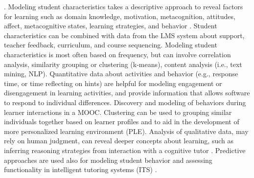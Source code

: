 \documentclass[sigconf]{acmart}
\begin{document}

.
Modeling student characteristics takes a descriptive approach to reveal factors 
for learning such as domain knowledge, 
motivation, metacognition, attitudes, affect, metacognitive states, learning 
strategies, and behavior \cite{Papamitsiou14}. Student characteristics can be 
combined with data from the LMS system about support, teacher feedback, 
curriculum, and course sequencing. Modeling student characteristics is most 
often based on frequency, but can involve correlation analysis, similarity 
grouping or clustering (k-means), content analysis (i.e., text mining, NLP). 
Quantitative data about activities and behavior (e.g., response time, or 
time reflecting on hints) are helpful for modeling engagement or disengagement 
in learning activities, and provide information that allows software to respond 
to individual differences. Discovery and modeling of behaviors during learner 
interactions in a MOOC.  Clustering can be used to grouping similar individuals 
together based on learner profiles and to aid in the development of more 
personalized learning environment (PLE)\cite{Vellido10}. Analysis of qualitative 
data, may rely on human judgment, can reveal deeper concepts about learning, 
such as inferring reasoning strategies from interaction with a cognitive tutor 
\cite{Fournier11}. Predictive approaches are used also for modeling student 
behavior and assessing functionality in intelligent tutoring systems (ITS)
. 


\end{document}
